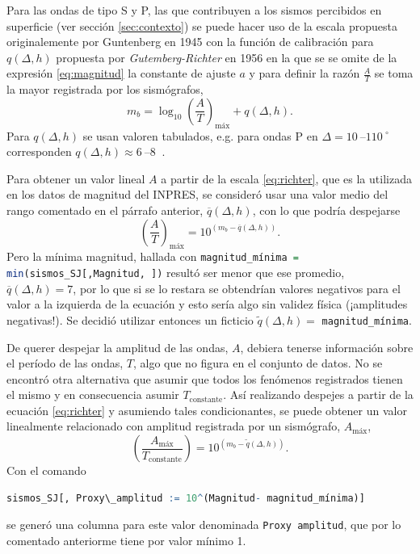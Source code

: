 \documentclass[a4paper]{report}
\begin{document}
Para las ondas de tipo S y P, las que contribuyen a los sismos percibidos en superficie (ver sección \ref{sec:contexto}) se puede hacer uso de la escala propuesta originalemente por Guntenberg en 1945 con la función de calibración para \(q(\Delta, h)\) propuesta por \emph{Gutemberg-Richter} en 1956 \cite[ecuación 4.18]{fowler_solid_1990} en la que se se omite de la expresión \ref{eq:magnitud} la constante de ajuste \(a\) y para definir la razón \(\frac{A}{T}\) se toma la mayor registrada por los sismógrafos,
\begin{equation}
	m_b = \log_{10} \left( \frac{A}{T} \right)_\text{máx} + q(\Delta, h).
	\label{eq:richter}
\end{equation}
Para \(q(\Delta, h)\) se usan valoren tabulados, e.g. para ondas P en \(\Delta = \SIrange{10}{110}{} ^\circ\) corresponden \(q(\Delta, h) \approx \SIrange{6}{8}{}\) \cite{willian_l_ellsworth_earthquake_1991}.

Para obtener un valor lineal \(A\) a partir de la escala \ref{eq:richter}, que es la utilizada en los datos de magnitud del INPRES, se consideró usar una valor medio del rango comentado en el párrafo anterior, \(\overline{q}(\Delta,h)\), con lo que podría despejarse
\begin{equation}
	\left( \frac{A}{T} \right)_\text{máx} = 10^{(m_b - \overline{q}(\Delta,h) )}.
	\label{eq:linealizacionMagnitud}
\end{equation}
Pero la mínima magnitud, hallada con \lstinline[language = R]'magnitud_mínima = min(sismos_SJ[,Magnitud, ])' resultó ser menor que ese promedio, \(\overline{q}(\Delta,h) = 7\), por lo que si se lo restara se obtendrían valores negativos para el valor a la izquierda de la ecuación y esto sería algo sin validez física (¡amplitudes negativas!).
Se decidió utilizar entonces un ficticio \(\tilde{q}(\Delta,h) = \) \lstinline[language = R]'magnitud_mínima'.  

De querer despejar la amplitud de las ondas, \(A\), debiera tenerse información sobre el período de las ondas, \(T\), algo que no figura en el conjunto de datos.
No se encontró otra alternativa que asumir que todos los fenómenos registrados tienen el mismo y en consecuencia asumir \(T_\text{constante}\).
Así realizando despejes a partir de la ecuación \ref{eq:richter} y asumiendo tales condicionantes, se puede obtener un valor linealmente relacionado con amplitud registrada por un sismógrafo, \(A_\text{máx}\),
\begin{equation}
	\left( \frac{A_\text{máx}}{T_\text{constante}} \right) = 10^{(m_b - \tilde{q}(\Delta, h))}.
	\label{eq:linealizacionMagnitud_final} 
\end{equation}
Con el comando
\begin{lstlisting}[breaklines=true, language=R]
sismos_SJ[, Proxy\_amplitud := 10^(Magnitud- magnitud_mínima)]
\end{lstlisting}
se generó una columna para este valor denominada \lstinline[language = R]'Proxy amplitud', que por lo comentado anteriorme tiene por valor mínimo \num{1}. 
\end{document}
